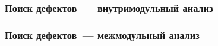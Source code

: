 \documentclass[hyperref={pdfpagelabels=false}]{beamer}
\begin{document}
\begin{frame}
\frametitle{Поиск дефектов~--- внутримодульный анализ}
\begin{figure}[h]
\end{figure}
\end{frame}

\begin{frame}
\frametitle{Поиск дефектов~--- межмодульный анализ}
\begin{figure}[h]
\end{figure}
\end{frame}
\end{document}

